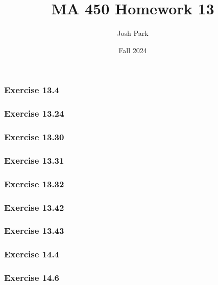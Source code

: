 \documentclass{article}
\author{Josh Park}
\date{\vspace*{-1em}Fall 2024}
\title{\vspace*{-2em}MA 450 Homework 13\vspace*{-1em}}
\begin{document}
\maketitle

\subsubsection*{Exercise 13.4}



\subsubsection*{Exercise 13.24}



\subsubsection*{Exercise 13.30}



\subsubsection*{Exercise 13.31}



\subsubsection*{Exercise 13.32}



\subsubsection*{Exercise 13.42}



\subsubsection*{Exercise 13.43}



\subsubsection*{Exercise 14.4}



\subsubsection*{Exercise 14.6}
\end{document}
